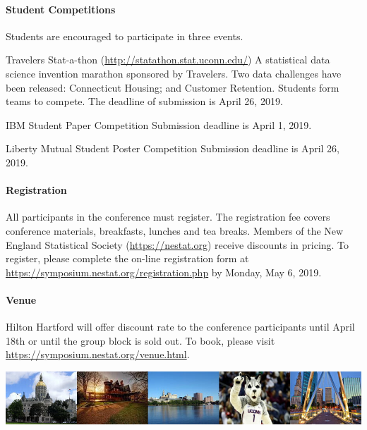 \documentclass[12pt]{article}
\begin{document}
\paragraph{Student Competitions} Students are encouraged to participate in three events.

\textsf{Travelers Stat-a-thon} (\url{http://statathon.stat.uconn.edu/})
A statistical data science invention marathon sponsored by Travelers. Two data challenges have been released: Connecticut Housing; and Customer Retention. Students form teams to compete. The deadline of submission is April 26, 2019.

\textsf{IBM Student Paper Competition} Submission deadline is April 1, 2019.

\textsf{Liberty Mutual Student Poster Competition} Submission deadline is April 26, 2019.


\paragraph{Registration}
All participants in the conference must register. The registration fee
covers conference materials, breakfasts, lunches and tea
breaks. Members of the New England Statistical Society
(\url{https://nestat.org}) receive discounts in pricing. To register,
please complete the on-line registration form at
\url{https://symposium.nestat.org/registration.php}
by Monday, May 6, 2019.


\paragraph{Venue}
Hilton Hartford will offer discount rate to the conference
participants until April 18th or until the group block is sold out. To
book, please visit
\url{https://symposium.nestat.org/venue.html}.


\vfill

\begin{center}
\includegraphics[width=\textwidth]{hartford-banner}
\end{center}
\end{document}
